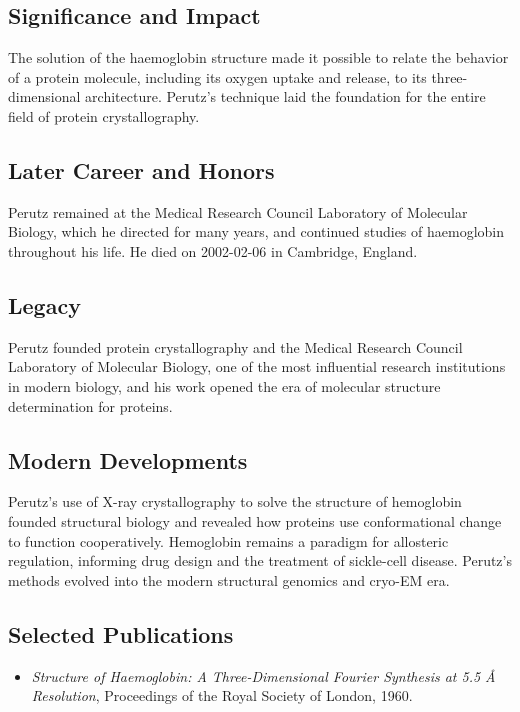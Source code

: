 \subsection*{Significance and Impact}

The solution of the haemoglobin structure made it possible to relate the behavior of a protein molecule, including its oxygen uptake and release, to its three-dimensional architecture. Perutz's technique laid the foundation for the entire field of protein crystallography.

\subsection*{Later Career and Honors}

Perutz remained at the Medical Research Council Laboratory of Molecular Biology, which he directed for many years, and continued studies of haemoglobin throughout his life. He died on 2002-02-06 in Cambridge, England.

\subsection*{Legacy}

Perutz founded protein crystallography and the Medical Research Council Laboratory of Molecular Biology, one of the most influential research institutions in modern biology, and his work opened the era of molecular structure determination for proteins.

\subsection*{Modern Developments}

Perutz's use of X-ray crystallography to solve the structure of hemoglobin founded structural biology and revealed how proteins use conformational change to function cooperatively. Hemoglobin remains a paradigm for allosteric regulation, informing drug design and the treatment of sickle-cell disease. Perutz's methods evolved into the modern structural genomics and cryo-EM era.

\subsection*{Selected Publications}

\begin{itemize}

\item \emph{Structure of Haemoglobin: A Three-Dimensional Fourier Synthesis at 5.5 {\AA} Resolution}, Proceedings of the Royal Society of London, 1960.

\end{itemize}

